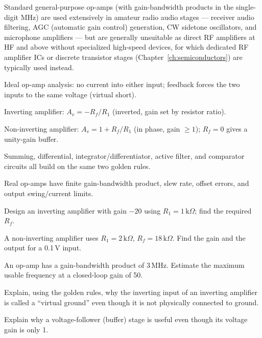 Standard general-purpose op-amps (with gain-bandwidth products in the
single-digit MHz) are used extensively in amateur radio audio stages ---
receiver audio filtering, AGC (automatic gain control) generation, CW
sidetone oscillators, and microphone amplifiers --- but are generally
unsuitable as direct RF amplifiers at HF and above without specialized
high-speed devices, for which dedicated RF amplifier ICs or discrete
transistor stages (Chapter~\ref{ch:semiconductors}) are typically used
instead.

\begin{quickreview}
\item Ideal op-amp analysis: no current into either input; feedback
forces the two inputs to the same voltage (virtual short).
\item Inverting amplifier: $A_v = -R_f/R_1$ (inverted, gain set by
resistor ratio).
\item Non-inverting amplifier: $A_v = 1+R_f/R_1$ (in phase, gain
$\geq1$); $R_f=0$ gives a unity-gain buffer.
\item Summing, differential, integrator/differentiator, active filter,
and comparator circuits all build on the same two golden rules.
\item Real op-amps have finite gain-bandwidth product, slew rate, offset
errors, and output swing/current limits.
\end{quickreview}

\begin{practiceproblems}
\item Design an inverting amplifier with gain $-20$ using
$R_1=1\,\text{k}\Omega$; find the required $R_f$.
\item A non-inverting amplifier uses $R_1=2\,\text{k}\Omega$,
$R_f=18\,\text{k}\Omega$. Find the gain and the output for a 0.1\,V
input.
\item An op-amp has a gain-bandwidth product of 3\,MHz. Estimate the
maximum usable frequency at a closed-loop gain of 50.
\item Explain, using the golden rules, why the inverting input of an
inverting amplifier is called a ``virtual ground'' even though it is not
physically connected to ground.
\item Explain why a voltage-follower (buffer) stage is useful even
though its voltage gain is only 1.
\end{practiceproblems}
